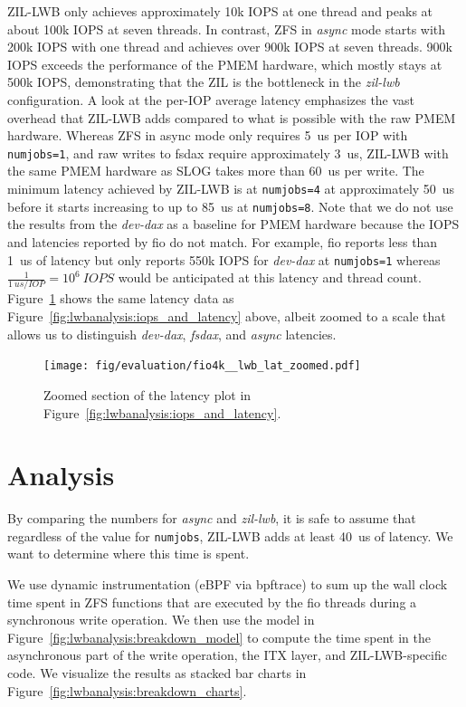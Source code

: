 \documentclass[12pt,a4paper,twoside]{book}
\begin{document}
{ZIL-LWB only achieves approximately 10k IOPS at one thread and peaks at about 100k IOPS at seven threads.
In contrast, ZFS in \textit{async} mode starts with 200k IOPS with one thread and achieves over 900k IOPS at seven threads.
900k IOPS exceeds the performance of the PMEM hardware, which mostly stays at 500k IOPS, demonstrating that the ZIL is the bottleneck in the \textit{zil-lwb} configuration.
A look at the per-IOP average latency emphasizes the vast overhead that ZIL-LWB adds compared to what is possible with the raw PMEM hardware.
Whereas ZFS in async mode only requires 5~us per IOP with \lstinline{numjobs=1}, and raw writes to fsdax require approximately 3~us, ZIL-LWB with the same PMEM hardware as SLOG takes more than 60~us per write.
The minimum latency achieved by ZIL-LWB is at \lstinline{numjobs=4} at approximately 50~us before it starts increasing to up to 85~us at \lstinline{numjobs=8}.
Note that we do not use the results from the \textit{dev-dax} as a baseline for PMEM hardware because the IOPS and latencies reported by fio do not match.
For example, fio reports less than 1~us of latency but only reports 550k IOPS for \textit{dev-dax} at \lstinline{numjobs=1} whereas $\frac{1}{1~us/IOP} = 10^6~\si{IOPS}$ would be anticipated at this latency and thread count.
Figure~\ref{fig:lwbanalysis:zoomed_latency} shows the same latency data as Figure~\ref{fig:lwbanalysis:iops_and_latency} above, albeit zoomed to a scale that allows us to distinguish \textit{dev-dax}, \textit{fsdax}, and \textit{async} latencies.

\begin{figure}[H]
    \centering
    \texttt{[image: fig/evaluation/fio4k\_\_lwb\_lat\_zoomed.pdf]}
    \caption{Zoomed section of the latency plot in Figure~\ref{fig:lwbanalysis:iops_and_latency}.}
    \label{fig:lwbanalysis:zoomed_latency}
\end{figure}

\section{Analysis}\label{ch:lwb_analysis:breakdown}

By comparing the numbers for \textit{async} and \textit{zil-lwb}, it is safe to assume that regardless of the value for \lstinline{numjobs}, ZIL-LWB adds at least 40~us of latency.
We want to determine where this time is spent.

We use dynamic instrumentation (eBPF via bpftrace) to sum up the wall clock time spent in ZFS functions that are executed by the fio threads during a synchronous write operation.
We then use the model in Figure~\ref{fig:lwbanalysis:breakdown_model} to compute the time spent in the asynchronous part of the write operation, the ITX layer, and ZIL-LWB-specific code.
We visualize the results as stacked bar charts in Figure~\ref{fig:lwbanalysis:breakdown_charts}.

}
\end{document}
